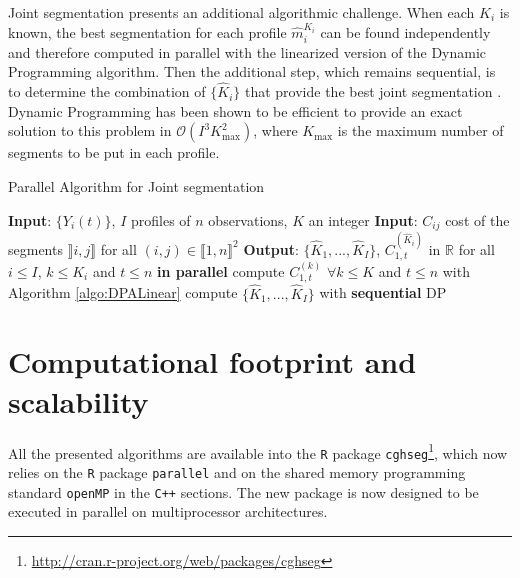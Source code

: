 \documentclass[11pt]{llncs}
\newcommand{\soft}{\texttt{cghseg}}
\begin{document}
Joint segmentation presents an additional algorithmic challenge. When each $K_i$ is known, the best segmentation for each profile $\widehat{m}_{i}^{K_i}$ can be found independently and therefore computed in parallel with the linearized version of the Dynamic Programming algorithm. Then the additional step, which remains sequential, is to determine the combination of $\{\widehat{K}_i\}$ that provide the best joint segmentation \cite{PLH11}. Dynamic Programming has been shown to be efficient to provide an exact solution to this problem in $\mathcal{O}(I^3 K_{\max}^2)$, where $K_{\max}$ is the maximum number of segments to be put in each profile. 



\begin{algorithm}
\begin{algorithmic}
\caption{Parallel Algorithm for Joint segmentation}\label{algo:parallelDP}
\State \textbf{Input}: $\{Y_i(t)\}$, $I$ profiles of $n$ observations, $K$ an integer 
\State \textbf{Input}: $C_{ij}$ cost of the segments $\rrbracket i, j \rrbracket$  for all $(i, j) \in \llbracket1, n \rrbracket^2$
\State \textbf{Output}:  $\{\widehat{K}_1,..., \widehat{K}_I\}$, $C^{(\widehat{K}_i)}_{1,t}$ in $\mathbb{R}$ for all $i \leq I$, $k \leq K_i$ and $t \leq n$ 
 {\bf in parallel}
\State compute $C^{(k)}_{1,t}$  $\forall k \leq K$ and $t \leq n$ with Algorithm \ref{algo:DPALinear}
\EndFor
\State compute $\{\widehat{K}_1,..., \widehat{K}_I\}$ with {\bf sequential} DP \cite{PLH11}
\EndWhile
  \end{algorithmic}
\end{algorithm}

\section{Computational footprint and scalability}

All the presented algorithms are available into the \texttt{R} package \soft \footnote{\url{http://cran.r-project.org/web/packages/cghseg}}, which now relies on the \texttt{R} package \texttt{parallel} and on the shared memory programming standard \texttt{openMP} in the \texttt{C++} sections. The new package is now designed to be executed in parallel on multiprocessor architectures.
\end{document}
